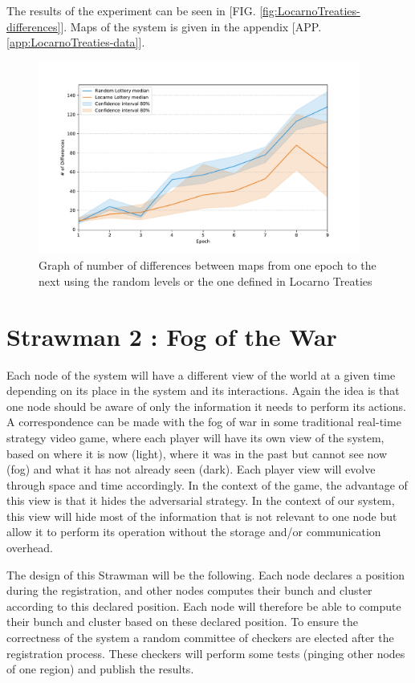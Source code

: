 \documentclass[a4paper,11pt,oneside]{report}
\begin{document}
The results of the experiment can be seen in [FIG. \autoref{fig:LocarnoTreaties-differences}]. Maps of
the system is given in the appendix [APP. \autoref{app:LocarnoTreaties-data}].

\begin{figure}[!h] 
\centering
\includegraphics[width=300pt]{figures/LocarnoTreaties-differences}
\caption{Graph of number of differences between maps from one epoch to the next using the random levels or the one defined in Locarno Treaties } \label{fig:LocarnoTreaties-differences}
\end{figure}

\section{Strawman 2 : Fog of the War}

Each node of the system will have a different view of the world at a given time
depending on its place in the system and its interactions. Again the idea is
that one node should be aware of only the information it needs to perform its
actions. A correspondence can be made with the fog of war in some traditional real-time
strategy video game, where each player will have its own view of the system,
based on where it is now (light), where it was in the past but
cannot see now (fog) and what it has not already seen (dark).
Each player view will evolve through space and time accordingly. In the context
of the game, the advantage of this view is that it hides the adversarial
strategy. In the context of our system, this view will hide most of the
information that is not relevant to one node but allow it to perform its
operation without the storage and/or communication overhead. 

The design of this Strawman will be the following. Each node declares a
position during the registration, and other nodes computes their bunch and
cluster according to this declared position. Each node will therefore be able
to compute their bunch and cluster based on these declared position. To ensure
the correctness of the system a random committee of checkers are elected after
the registration process. These checkers will perform some tests (pinging other
nodes of one region) and publish the results. 
\end{document}

